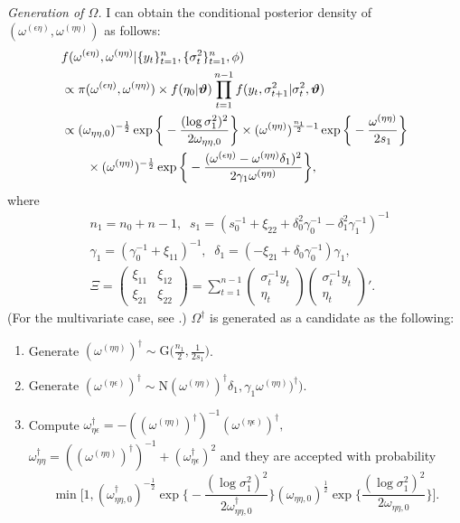\documentclass[11pt]{article}
\begin{document}
\noindent
{\it Generation of $\Omega$.} 
I can obtain the conditional posterior density of $(\omega^{(\epsilon\eta)}, \omega^{(\eta\eta)})$ as follows:   
\begin{align}
&f(\omega^{(\epsilon\eta)}, \omega^{(\eta\eta)} |\{y_t\}_{t=1}^n, \{\sigma^2_t\}_{t=1}^n, \phi) \notag \\
&\propto \pi(\omega^{(\epsilon\eta)}, \omega^{(\eta\eta)}) \times f(\eta_0|\bm{\vartheta}) \prod_{t=1}^{n-1} f(y_t, \sigma^2_{t+1} |\sigma^2_{t}, \bm{\vartheta}) \\
&\propto (\omega_{\eta\eta, 0})^{-\frac{1}{2}} \exp\bigg\{ -\frac{(\log\sigma^2_1)^2}{2\omega_{\eta\eta, 0}} \bigg\} 
\times (\omega^{(\eta\eta)})^{\frac{n_1}{2}-1} \exp\bigg\{ -\frac{\omega^{(\eta\eta)}}{2s_1} \bigg\} \notag \\
&\hspace{20pt}\times (\omega^{(\eta\eta)})^{-\frac{1}{2}} \exp\bigg\{ -\frac{(\omega^{(\epsilon\eta)}-\omega^{(\eta\eta)}\delta_1)^2}{2\gamma_1\omega^{(\eta\eta)}} \bigg\}, 
\end{align}
where
\begin{align}
&n_1=n_0+n-1, \;\; s_1=(s_0^{-1} +\xi_{22} +\delta_0^2\gamma_0^{-1} -\delta_1^2\gamma_1^{-1})^{-1} \\
&\gamma_1 =(\gamma_0^{-1} +\xi_{11})^{-1}, \;\; \delta_1 =(-\xi_{21} +\delta_0\gamma_0^{-1})\gamma_1, \\
&\Xi =\begin{pmatrix} 
\xi_{11} & \xi_{12} \\
\xi_{21} & \xi_{22} 
\end{pmatrix}
=\sum_{t=1}^{n-1} 
\begin{pmatrix} 
\sigma^{-1}_t y_t \\ \eta_t 
\end{pmatrix}
\begin{pmatrix} 
\sigma^{-1}_t y_t \\ \eta_t 
\end{pmatrix}'.  
\end{align}
(For the multivariate case, see \cite{Ishihara_etal(2016)}.) 
$\Omega^\dagger$ is generated as a candidate as the following:

\begin{enumerate}
\item 
Generate $(\omega^{(\eta\eta)})^\dagger \sim\mathrm{G}\big(\frac{n_1}{2}, \frac{1}{2s_1}\big)$.
\item 
Generate $(\omega^{(\eta\epsilon)})^\dagger \sim\mathrm{N}(\omega^{(\eta\eta)})^\dagger \delta_1,  \gamma_1\omega^{(\eta\eta)})^\dagger)$.
\item 
Compute $\omega_{\eta\epsilon}^\dagger =-((\omega^{(\eta\eta)})^\dagger)^{-1} (\omega^{(\eta\epsilon)})^\dagger,$ 
$\omega_{\eta\eta}^\dagger = ((\omega^{(\eta\eta)})^\dagger)^{-1} + (\omega_{\eta\epsilon}^\dagger)^2$ 
and they are accepted with probability
\begin{equation}
\min \Bigg[ 1, 
(\omega_{\eta\eta, 0}^\dagger)^{-\frac{1}{2}} \exp\bigg\{ -\frac{(\log\sigma^2_1)^2}{2\omega_{\eta\eta, 0}^\dagger} \bigg\}
(\omega_{\eta\eta, 0})^{\frac{1}{2}} \exp\bigg\{ \frac{(\log\sigma^2_1)^2}{2\omega_{\eta\eta, 0}} \bigg\}
\Bigg]. 
\end{equation}
\end{enumerate}
\end{document}
